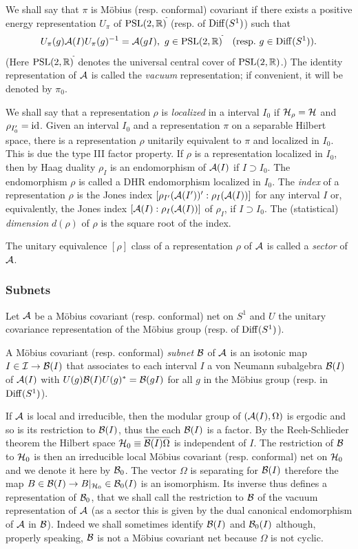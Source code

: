 \documentclass[12pt]{article}
\def\Diff{{\rm Diff}}
\def\r{\rho}
\def\Om{\Omega}
\def\PSL{{{\rm PSL}(2,\mathbb R)}}
\def\A{{\cal A}}
\def\B{{\cal B}}
\def\I{{\cal I}}
\def\H{{\cal H}}
\begin{document}
We shall say that $\pi$ is  M\"{o}bius (resp. conformal) covariant
if there exists a positive energy representation $U_{\pi}$ of 
$\PSL^{\tilde{}}$ (resp. of $\Diff(S^1)$) such that
\[
U_{\pi}(g)\A(I)U_{\pi}(g)^{-1}= \A(gI),
\ g \in\PSL^{\tilde{}}\quad (\text{resp.}\ 
g\in\Diff(S^1) ).
\]
(Here $\PSL^{\tilde{}}$ denotes the universal central cover of $\PSL$.)
The identity representation of $\A$ is called the {\it vacuum} 
representation; if convenient, it will be denoted by $\pi_0$.

We shall say that a representation $\r$ is {\it localized} in a 
interval $I_0$ if $\H_{\r}=\H$ and $\rho_{I'_0}={\rm id}$. Given an 
interval $I_0$ and a representation $\pi$ on a separable Hilbert 
space, there is a representation $\rho$ unitarily equivalent to $\pi$ 
and localized in $I_0$. This is due the type III factor property.
If $\r$ is a representation localized in $I_0$, then by Haag duality 
$\r_I$ is an endomorphism of $\A(I)$ if $I\supset I_0$. 
The endomorphism $\r$ is called a 
DHR endomorphism \cite{DHR} localized in $I_0$. The {\it index} of a 
representation $\r$ is the Jones index $[\r_{I'}(\A(I'))':\r_I(\A(I))]$ 
for any interval $I$ or, equivalently,
the Jones index $[\A(I):\r_I(\A(I))]$ of $\r_I$, if $I\supset I_0$. 
The (statistical) {\it dimension} $d(\rho)$ of $\r$ is the square 
root of the index.

The unitary equivalence $[\r]$ class of a representation $\r$ of $\A$ 
is called a {\it sector} of $\A$.

\subsubsection{Subnets}

Let $\A$ be a M\"{o}bius covariant (resp. conformal) net on $S^1$ and 
$U$ the unitary covariance representation of the M\"{o}bius group 
(resp. of $\Diff(S^1)$). 

A M\"{o}bius covariant (resp. conformal) {\it subnet} $\B$ of $\A$ is 
an isotonic map $I\in\I\to\B(I)$ that associates to each interval $I$ a von 
Neumann subalgebra $\B(I)$ of $\A(I)$ with $U(g)\B(I)U(g)^*=\B(gI)$ 
for all $g$ in the M\"{o}bius group (resp. in $\Diff(S^1)$). 

If $\A$ is local and irreducible, then the modular group of 
$(\A(I),\Om)$ is ergodic and so is its restriction to $\B(I)$, thus 
the each $\B(I)$ is a factor. By the Reeh-Schlieder theorem the 
Hilbert space $\H_0\equiv\overline{\B(I)\Om}$ is independent of $I$. 
The restriction of $\B$ to $\H_0$ is then an irreducible local M\"{o}bius 
covariant (resp. conformal) net on $\H_0$ and we denote it here by 
$\B_0$. The vector $\Om$ is separating for $\B(I)$ therefore the map 
$B\in\B(I)\to B|_{\H_0}\in\B_0(I)$ is an isomorphism. Its inverse 
thus defines a representation of $\B_0$, that we shall call the restriction 
to $\B$ of the vacuum representation of $\A$ (as a sector this is 
given by the dual canonical 
endomorphism of $\A$ in $\B$). Indeed we shall sometimes 
identify $\B(I)$ and $\B_0(I)$ although, properly speaking, $\B$ is 
not a M\"{o}bius covariant net because $\Om$ is not cyclic.
\end{document}
